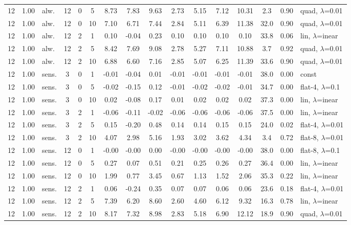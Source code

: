 \begin{scriptsize}
\begin{longtable}{cclcc c ccc ccc c cc l}
12 & 1.00 & alw. & 12 & 0 & 5 & 8.73 & 7.83 & 9.63 & 2.73 & 5.15 & 7.12 & 10.31 & 2.3 & 0.90 & quad, $\lambda$=0.01 \\
12 & 1.00 & alw. & 12 & 0 & 10 & 7.10 & 6.71 & 7.44 & 2.84 & 5.11 & 6.39 & 11.38 & 32.0 & 0.90 & quad, $\lambda$=0.01 \\
12 & 1.00 & alw. & 12 & 2 & 1 & 0.10 & -0.04 & 0.23 & 0.10 & 0.10 & 0.10 & 0.10 & 33.8 & 0.06 & lin, $\lambda$=inear \\
12 & 1.00 & alw. & 12 & 2 & 5 & 8.42 & 7.69 & 9.08 & 2.78 & 5.27 & 7.11 & 10.88 & 3.7 & 0.92 & quad, $\lambda$=0.01 \\
12 & 1.00 & alw. & 12 & 2 & 10 & 6.88 & 6.60 & 7.16 & 2.85 & 5.07 & 6.25 & 11.39 & 33.6 & 0.90 & quad, $\lambda$=0.01 \\
12 & 1.00 & sens. & 3 & 0 & 1 & -0.01 & -0.04 & 0.01 & -0.01 & -0.01 & -0.01 & -0.01 & 38.0 & 0.00 & const \\
12 & 1.00 & sens. & 3 & 0 & 5 & -0.02 & -0.15 & 0.12 & -0.01 & -0.02 & -0.02 & -0.01 & 34.7 & 0.00 & flat-4, $\lambda$=0.1 \\
12 & 1.00 & sens. & 3 & 0 & 10 & 0.02 & -0.08 & 0.17 & 0.01 & 0.02 & 0.02 & 0.02 & 37.3 & 0.00 & lin, $\lambda$=inear \\
12 & 1.00 & sens. & 3 & 2 & 1 & -0.06 & -0.11 & -0.02 & -0.06 & -0.06 & -0.06 & -0.06 & 37.5 & 0.00 & lin, $\lambda$=inear \\
12 & 1.00 & sens. & 3 & 2 & 5 & 0.15 & -0.20 & 0.48 & 0.14 & 0.14 & 0.15 & 0.15 & 24.0 & 0.02 & flat-4, $\lambda$=0.01 \\
12 & 1.00 & sens. & 3 & 2 & 10 & 4.07 & 2.98 & 5.16 & 1.93 & 3.02 & 3.62 & 4.34 & 3.4 & 0.72 & flat-8, $\lambda$=0.01 \\
12 & 1.00 & sens. & 12 & 0 & 1 & -0.00 & -0.00 & 0.00 & -0.00 & -0.00 & -0.00 & -0.00 & 38.0 & 0.00 & flat-8, $\lambda$=0.1 \\
12 & 1.00 & sens. & 12 & 0 & 5 & 0.27 & 0.07 & 0.51 & 0.21 & 0.25 & 0.26 & 0.27 & 36.4 & 0.00 & lin, $\lambda$=inear \\
12 & 1.00 & sens. & 12 & 0 & 10 & 1.99 & 0.77 & 3.45 & 0.67 & 1.13 & 1.52 & 2.06 & 35.3 & 0.22 & lin, $\lambda$=inear \\
12 & 1.00 & sens. & 12 & 2 & 1 & 0.06 & -0.24 & 0.35 & 0.07 & 0.07 & 0.06 & 0.06 & 23.6 & 0.18 & flat-4, $\lambda$=0.01 \\
12 & 1.00 & sens. & 12 & 2 & 5 & 7.39 & 6.20 & 8.60 & 2.60 & 4.60 & 6.12 & 9.32 & 16.3 & 0.78 & lin, $\lambda$=inear \\
12 & 1.00 & sens. & 12 & 2 & 10 & 8.17 & 7.32 & 8.98 & 2.83 & 5.18 & 6.90 & 12.12 & 18.9 & 0.90 & quad, $\lambda$=0.01 \\
\end{longtable}
\end{scriptsize}